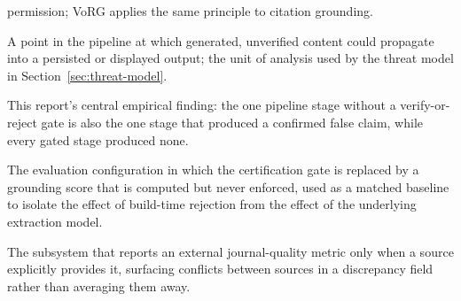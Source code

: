 \documentclass[12pt,a4paper]{report}
\begin{document}
\begin{description}[leftmargin=3.6cm,style=nextline]
        permission; VoRG applies the same principle to citation grounding.
  \item[Trust-boundary crossing] A point in the pipeline at which generated,
        unverified content could propagate into a persisted or displayed
        output; the unit of analysis used by the threat model in
        Section~\ref{sec:threat-model}.
  \item[Gap-to-failure correspondence] This report's central empirical
        finding: the one pipeline stage without a verify-or-reject gate is
        also the one stage that produced a confirmed false claim, while every
        gated stage produced none.
  \item[Scored-grounding ablation] The evaluation configuration in which the
        certification gate is replaced by a grounding score that is computed
        but never enforced, used as a matched baseline to isolate the effect
        of build-time rejection from the effect of the underlying extraction
        model.
  \item[Journal-metadata reconciliation] The subsystem that reports an
        external journal-quality metric only when a source explicitly
        provides it, surfacing conflicts between sources in a discrepancy
        field rather than averaging them away.
\end{description}
\end{document}

